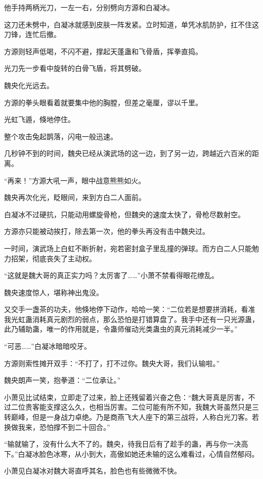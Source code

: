 \begin{this_body}
他手持两柄光刀，一左一右，分别劈向方源和白凝冰。

这刀还未劈中，白凝冰就感到皮肤一阵发紧。立时知道，单凭冰肌防护，扛不住这刀锋，连忙后撤。

方源则轻声低喝，不闪不避，撑起天蓬蛊和飞骨盾，挥拳直捣。

光刀先一步看中旋转的白骨飞盾，将其劈破。

魏央化光远去。

方源的拳头眼看着就要集中他的胸膛，但差之毫厘，谬以千里。

光虹飞遁，倏地停住。

整个攻击兔起鹊落，闪电一般迅速。

几秒钟不到的时间，魏央已经从演武场的这一边，到了另一边，跨越近六百米的距离。

“再来！”方源大吼一声，眼中战意熊熊如火。

魏央再次化光，眨眼间，来到方白二人面前。

白凝冰不过硬抗，只能动用螺旋骨枪，但魏央的速度太快了，骨枪尽数射空。

方源亦只能被动挨打，除去第一次，他的拳头再没有击中魏央过。

一时间，演武场上白虹不断折射，宛若密封盒子里乱撞的弹球。而方白二人只能勉力招架，彻底丧失了主动权。

“这就是魏大哥的真正实力吗？太厉害了……”小萧不禁看得眼花缭乱。

魏央速度惊人，堪称神出鬼没。

又交手一盏茶的功夫，他倏地停下动作，哈哈一笑：“二位若是想要拼消耗，看准我光虹蛊消耗真元剧烈的弱点，那么恐怕是打错算盘了。我手中还有一只光源蛊，此乃辅助蛊，唯一的作用就是，令蛊师催动光类蛊虫的真元消耗减少一半。”

“可恶……”白凝冰暗暗咬牙。

方源则索性摊开双手：“不打了，打不过你。魏央大哥，我们认输啦。”

魏央朗声一笑，抱拳道：“二位承让。”

小萧见比试结束，立即走了过来，脸上还残留着兴奋之色：“魏大哥真是厉害，不过二位贵客能支撑这么久，也相当厉害。二位可能有所不知，我魏大哥虽然只是三转巅峰，但是一身战力卓绝。乃是商燕飞大人座下的第三战将，人称白光刀客。若换做我来，恐怕撑不到二十回合。”

“输就输了，没有什么大不了的。魏央，待我日后有了趁手的蛊，再与你一决高下。”白凝冰脸色冰寒，从小到大，高傲如她还未输的这么难看过，心情自然郁闷。

小萧见白凝冰对魏大哥直呼其名，脸色也有些微微不快。


\end{this_body}
